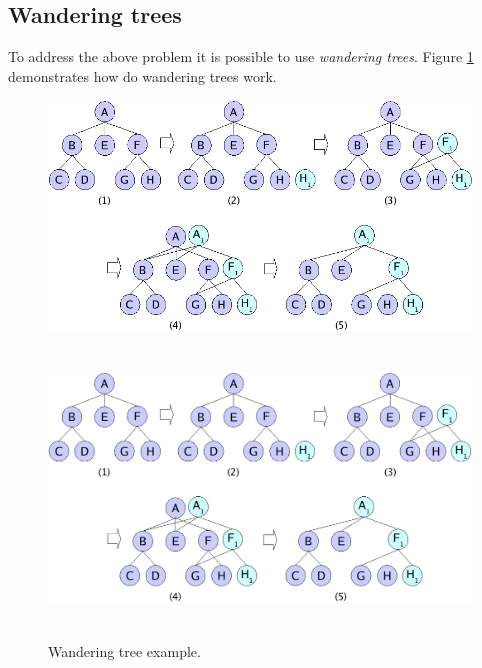 \documentclass[12pt,a4paper,oneside,titlepage]{article}
\begin{document}
%
%
\subsection{Wandering trees} \label{ref_SectionWandTrees}

To address the above problem it is possible to use \emph{wandering trees}.
Figure \ref{ref_FigureWandtree} demonstrates how do wandering trees work.

%
%
\begin{figure}[h]
\begin{center}
\begin{htmlonly}
\includegraphics{pics/wandtree.png}
\end{htmlonly}
\includegraphics[width=159mm,height=80mm]{pics/wandtree.pdf}
\end{center}
\caption{Wandering tree example.}
\label{ref_FigureWandtree}
\end{figure}
\end{document}
